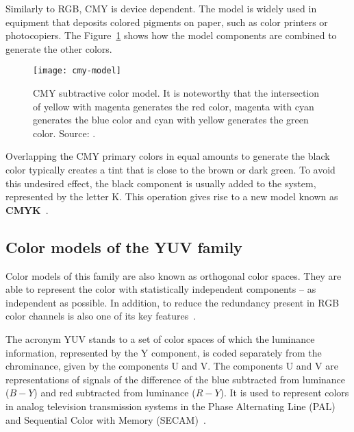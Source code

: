 Similarly to RGB, CMY is device dependent. The model is widely used in equipment that deposits colored pigments on paper, such as color printers or photocopiers. The Figure~\ref{fig:cmy-model} shows how the model components are combined to generate the other colors.

\begin{figure}[!ht]
  \centering
  \texttt{[image: cmy-model]}
  \caption[CMY subtractive color model]{CMY subtractive color model. It is noteworthy that the intersection of yellow with magenta generates the red color, magenta with cyan generates the blue color and cyan with yellow generates the green color. Source: \citet{rus:08}.}
  \label{fig:cmy-model}
\end{figure}

Overlapping the CMY primary colors in equal amounts to generate the black color typically creates a tint that is close to the brown or dark green. To avoid this undesired effect, the black component is usually added to the system, represented by the letter K. This operation gives rise to a new model known as \textbf{CMYK}~\citep{gonzalez:02}.


\subsection{Color models of the YUV family}
\label{sec:modelo_cores_yuv}

Color models of this family are also known as orthogonal color spaces. They are able to represent the color with statistically independent components -- as independent as possible. In addition, to reduce the redundancy present in RGB color channels is also one of its key features~\citep{kakumanu:07}.

The acronym YUV stands to a set of color spaces of which the luminance information, represented by the Y component, is coded separately from the chrominance, given by the components U and V. The components U and V are representations of signals of the difference of the blue subtracted from luminance ($B-Y$) and red subtracted from luminance ($R-Y$). It is used to represent colors in analog television transmission systems in the Phase Alternating Line (PAL) and Sequential Color with Memory (SECAM)~\citep{pedrini:08}.

